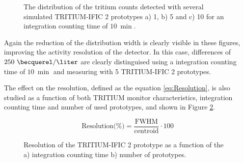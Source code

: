 \begin{figure}[h]
 \centering
   \newline
 \caption{The distribution of the tritium counts detected with several simulated TRITIUM-IFIC 2 prototypes a) 1, b) 5 and c) 10 for an integration counting time of $10~\min$.}
 \label{fig:SeveralDet250BqL10min}
\end{figure}

Again the reduction of the distribution width is clearly visible in these figures, improving the activity resolution of the detector. In this case, differences of $250~\becquerel/\liter$ are clearly distinguised using a integration counting time of $10~\min$ and measuring with 5 TRITIUM-IFIC 2 prototypes. 

The effect on the resolution, defined as the equation \ref{eq:Resolution}, is also studied as a function of both TRITIUM monitor characteristics, integration counting time and number of used prototypes, and shown in Figure \ref{fig:Resolution}.

\begin{equation}
\text{Resolution(\%)}=\frac{\text{FWHM}}{\text{centroid}}\cdot{}100
\label{eq:Resolution}
\end{equation}

\begin{figure}[h]
 \centering
 \caption{Resolution of the TRITIUM-IFIC 2 prototype as a function of the a) integration counting time b) number of prototypes.}
 \label{fig:Resolution}
\end{figure}

